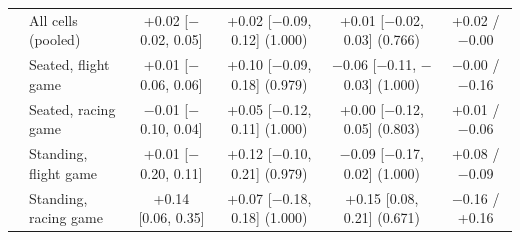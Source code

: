 \begin{table}[ht]
\begin{tabular}{@{}llcccc@{}}
 & All cells (pooled) & +0.02 [$-$0.02, 0.05] & +0.02 [$-$0.09, 0.12] (1.000) & +0.01 [$-$0.02, 0.03] (0.766) & +0.02 / $-$0.00 \\
 & Seated, flight game & +0.01 [$-$0.06, 0.06] & +0.10 [$-$0.09, 0.18] (0.979) & $-$0.06 [$-$0.11, $-$0.03] (1.000) & $-$0.00 / $-$0.16 \\
 & Seated, racing game & $-$0.01 [$-$0.10, 0.04] & +0.05 [$-$0.12, 0.11] (1.000) & +0.00 [$-$0.12, 0.05] (0.803) & +0.01 / $-$0.06 \\
 & Standing, flight game & +0.01 [$-$0.20, 0.11] & +0.12 [$-$0.10, 0.21] (0.979) & $-$0.09 [$-$0.17, 0.02] (1.000) & +0.08 / $-$0.09 \\
 & Standing, racing game & +0.14 [0.06, 0.35] & +0.07 [$-$0.18, 0.18] (1.000) & +0.15 [0.08, 0.21] (0.671) & $-$0.16 / +0.16 \\
\bottomrule
\end{tabular}
\end{table}
